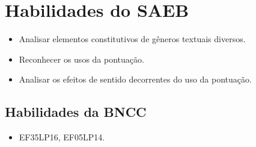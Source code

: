 
\section*{Habilidades do SAEB}

\begin{itemize}
\item Analisar elementos constitutivos de gêneros textuais diversos.

\item Reconhecer os usos da pontuação.

\item Analisar os efeitos de sentido decorrentes do uso da pontuação.
\end{itemize}

\subsection{Habilidades da BNCC}

\begin{itemize}
\item EF35LP16, EF05LP14.
\end{itemize}

